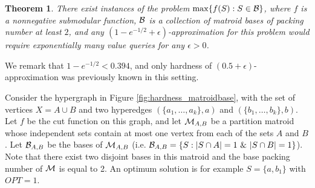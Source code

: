 \documentclass{article}[11pt]
\newtheorem{theorem}{Theorem}[section]
\def\cM{{\cal M}}
\def\cB{{\cal B}}
\def\eps {\epsilon}
\def\max{{\rm{max}}}
\begin{document}
\begin{theorem}
\label{thm:hard_matroidbase}
There exist instances of the problem $\max \{f(S): S \in \cB \}$,
where $f$ is a nonnegative submodular function, $\cB$ is a collection of matroid bases
of packing number at least $2$, and any $(1-e^{-1/2}+\eps)$-approximation
for this problem would require exponentially many value queries for any $\eps>0$.
\end{theorem}

We remark that $1-e^{-1/2} < 0.394$, and only hardness of $(0.5+\eps)$-approximation
was previously known in this setting. 

\medskip
{}
Consider the hypergraph in Figure \ref{fig:hardness_matroidbase},
with the set of vertices $X=A \cup B$ and two hyperedges $(\{a_1,\ldots,a_k\},a)$ and
$(\{b_1,\ldots,b_k\},b)$. Let $f$ be the cut function on this graph,
and let $\cM_{A,B}$ be a partition matroid whose independent sets contain at most
one vertex from each of the sets $A$ and $B$. Let $\cB_{A,B}$ be the bases of $\cM_{A,B}$
(i.e. $\cB_{A,B} = \{S: |S\cap A| = 1~\&~|S \cap B|=1\}$).
Note that there exist two disjoint bases in this matroid
and the base packing number of $\cM$ is equal to 2.  
An optimum solution is for example $S = \{a,b_1\}$ with $OPT=1$. 
\end{document}
